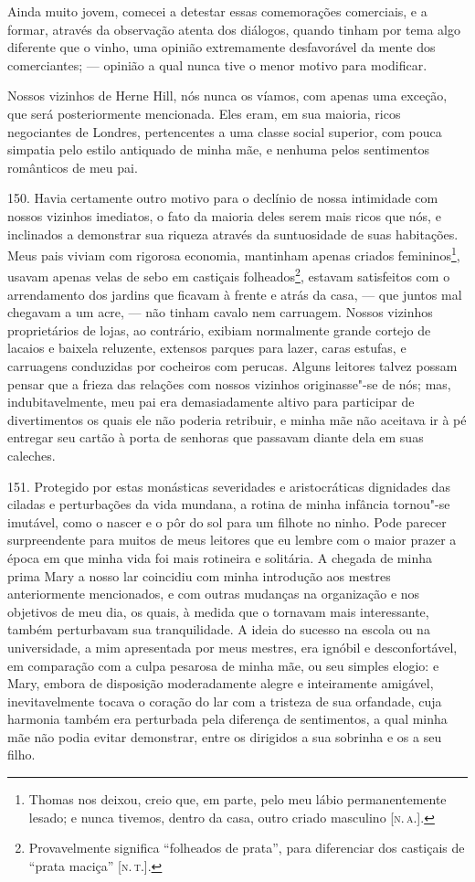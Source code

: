 Ainda muito jovem, comecei a detestar essas comemorações comerciais, e a
formar, através da observação atenta dos diálogos, quando tinham por
tema algo diferente que o vinho, uma opinião extremamente desfavorável
da mente dos comerciantes; --- opinião a qual nunca tive o menor motivo
para modificar.

Nossos vizinhos de Herne Hill, nós nunca os víamos, com apenas uma
exceção, que será posteriormente mencionada. Eles eram, em sua maioria,
ricos negociantes de Londres, pertencentes a uma classe social superior,
com pouca simpatia pelo estilo antiquado de minha mãe, e nenhuma pelos
sentimentos românticos de meu pai.

150. Havia certamente outro motivo para o declínio de nossa intimidade
com nossos vizinhos imediatos, o fato da maioria deles serem mais ricos
que nós, e inclinados a demonstrar sua riqueza através da suntuosidade
de suas habitações. Meus pais viviam com rigorosa economia, mantinham
apenas criados femininos\footnote{Thomas nos deixou, creio que, em
  parte, pelo meu lábio permanentemente lesado; e nunca tivemos, dentro
  da casa, outro criado masculino {[}\textsc{n.\,a.}{]}.}, usavam apenas velas
de sebo em castiçais folheados\footnote{Provavelmente significa
  ``folheados de prata'', para diferenciar dos castiçais de ``prata
  maciça'' {[}\textsc{n.\,t.}{]}.}, estavam satisfeitos com o arrendamento dos
jardins que ficavam à frente e atrás da casa, --- que juntos mal chegavam
a um acre, --- não tinham cavalo nem carruagem. Nossos vizinhos
proprietários de lojas, ao contrário, exibiam normalmente grande cortejo
de lacaios e baixela reluzente, extensos parques para lazer, caras
estufas, e carruagens conduzidas por cocheiros com perucas. Alguns
leitores talvez possam pensar que a frieza das relações com nossos
vizinhos originasse"-se de nós; mas, indubitavelmente, meu pai era
demasiadamente altivo para participar de divertimentos os quais ele não
poderia retribuir, e minha mãe não aceitava ir à pé entregar seu cartão
à porta de senhoras que passavam diante dela em suas caleches.

151. Protegido por estas monásticas severidades e aristocráticas
dignidades das ciladas e perturbações da vida mundana, a rotina de minha
infância tornou"-se imutável, como o nascer e o pôr do sol para um
filhote no ninho. Pode parecer surpreendente para muitos de meus
leitores que eu lembre com o maior prazer a época em que minha vida foi
mais rotineira e solitária. A chegada de minha prima Mary a nosso lar
coincidiu com minha introdução aos mestres anteriormente mencionados, e
com outras mudanças na organização e nos objetivos de meu dia, os quais,
à medida que o tornavam mais interessante, também perturbavam sua
tranquilidade. A ideia do sucesso na escola ou na universidade, a mim
apresentada por meus mestres, era ignóbil e desconfortável, em
comparação com a culpa pesarosa de minha mãe, ou seu simples elogio: e
Mary, embora de disposição moderadamente alegre e inteiramente amigável,
inevitavelmente tocava o coração do lar com a tristeza de sua orfandade,
cuja harmonia também era perturbada pela diferença de sentimentos, a
qual minha mãe não podia evitar demonstrar, entre os dirigidos a sua
sobrinha e os a seu filho.

